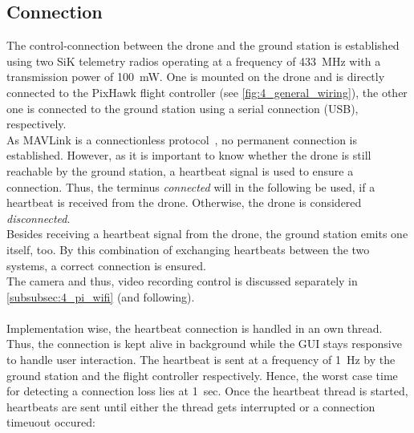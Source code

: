 \subsection{Connection}\label{subsec:4_drone_conn}
The control-connection between the drone and the ground station is established
using two SiK telemetry radios operating at a frequency of 433~MHz with a
transmission power of 100~mW.
One is mounted on the drone and is directly connected to the PixHawk flight
controller (see \autoref{fig:4_general_wiring}), the other one is connected
to the ground station using a serial connection (USB), respectively.\\
As MAVLink is a connectionless protocol~\cite{atoevDataAnalysisMAVLink2017},
no permanent connection is established.
However, as it is important to know whether the drone is still reachable by
the ground station, a heartbeat signal is used to ensure a connection.
Thus, the terminus \textit{connected} will in the following be used, if a
heartbeat is received from the drone.
Otherwise, the drone is considered \textit{disconnected}.\\
Besides receiving a heartbeat signal from the drone, the ground station emits
one itself, too.
By this combination of exchanging heartbeats between the two systems, a correct
connection is ensured.\\
The camera and thus, video recording control is discussed separately in
\autoref{subsubsec:4_pi_wifi} (and following).\\\\
\noindent Implementation wise, the heartbeat connection is handled in an own
thread.
Thus, the connection is kept alive in background while the \ac{GUI} stays
responsive to handle user interaction.
The heartbeat is sent at a frequency of 1~Hz by the ground station and the
flight controller respectively.
Hence, the worst case time for detecting a connection loss lies at 1~sec.
Once the heartbeat thread is started, heartbeats are sent until either the
thread gets interrupted or a connection timeuout occured:


